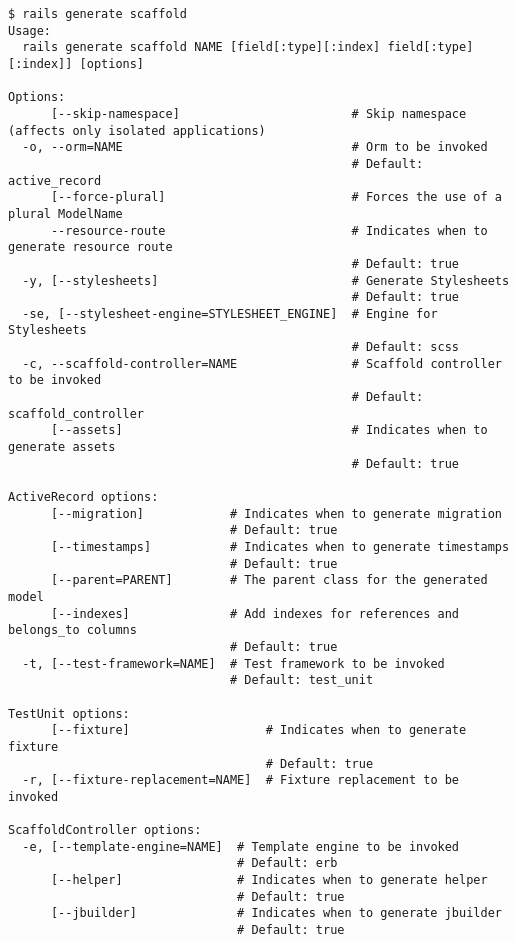 \documentclass[a4paper]{book}
\begin{document}
\begin{shaded}\begin{verbatim}
$ rails generate scaffold
Usage:
  rails generate scaffold NAME [field[:type][:index] field[:type][:index]] [options]

Options:
      [--skip-namespace]                        # Skip namespace (affects only isolated applications)
  -o, --orm=NAME                                # Orm to be invoked
                                                # Default: active_record
      [--force-plural]                          # Forces the use of a plural ModelName
      --resource-route                          # Indicates when to generate resource route
                                                # Default: true
  -y, [--stylesheets]                           # Generate Stylesheets
                                                # Default: true
  -se, [--stylesheet-engine=STYLESHEET_ENGINE]  # Engine for Stylesheets
                                                # Default: scss
  -c, --scaffold-controller=NAME                # Scaffold controller to be invoked
                                                # Default: scaffold_controller
      [--assets]                                # Indicates when to generate assets
                                                # Default: true

ActiveRecord options:
      [--migration]            # Indicates when to generate migration
                               # Default: true
      [--timestamps]           # Indicates when to generate timestamps
                               # Default: true
      [--parent=PARENT]        # The parent class for the generated model
      [--indexes]              # Add indexes for references and belongs_to columns
                               # Default: true
  -t, [--test-framework=NAME]  # Test framework to be invoked
                               # Default: test_unit

TestUnit options:
      [--fixture]                   # Indicates when to generate fixture
                                    # Default: true
  -r, [--fixture-replacement=NAME]  # Fixture replacement to be invoked

ScaffoldController options:
  -e, [--template-engine=NAME]  # Template engine to be invoked
                                # Default: erb
      [--helper]                # Indicates when to generate helper
                                # Default: true
      [--jbuilder]              # Indicates when to generate jbuilder
                                # Default: true


\end{verbatim}
\end{shaded}
\end{document}
